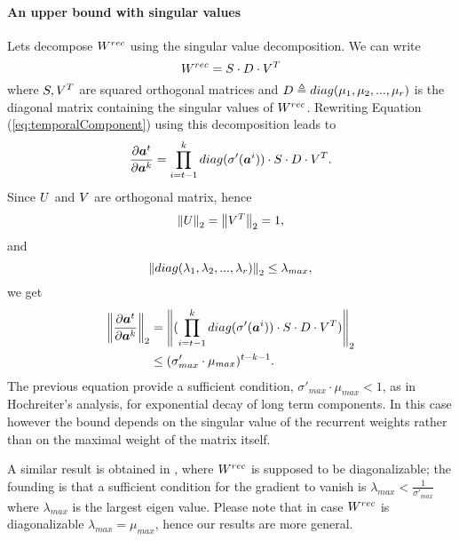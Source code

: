 \paragraph{An upper bound with singular values}
Lets decompose $W^{rec}$ using the singular value decomposition. We can write
\begin{equation}
	W^{rec} =  S\cdot D\cdot V^T
\end{equation}
where $S,V^T$ are squared orthogonal matrices and $D\triangleq diag(\mu_1, \mu_2,...,\mu_r)$ is the diagonal matrix containing the singular values of $W^{rec}$.
Rewriting Equation (\ref{eq:temporalComponent}) using this decomposition leads to
\begin{equation}
	\frac{\partial \boldsymbol{a}^t}{\partial \boldsymbol{a}^k} = \prod_{i=t-1}^{k}  diag(\sigma'(\boldsymbol{a}^i)) \cdot S\cdot D \cdot V^T.
\end{equation}
Since $U$ and $V$ are orthogonal matrix, hence $$\left\Vert U \right\Vert_2=\left\Vert V^T \right\Vert_2 = 1,$$ and $$\left\Vert diag(\lambda_1, \lambda_2,...,\lambda_r) \right\Vert_2 \leq \lambda_{max},$$ we get
\begin{align}
	\left\Vert \frac{\partial \boldsymbol{a}^t}{\partial \boldsymbol{a}^k} \right\Vert_2 &= \left\Vert  (\prod_{i=t-1}^{k} diag(\sigma'(\boldsymbol{a}^i)) \cdot S\cdot D \cdot V^T) \right\Vert_2\\
	&\leq (\sigma'_{max} \cdot \mu_{max})^{t-k-1}.
\end{align}
The previous equation provide a sufficient condition, $\sigma'_{max} \cdot \mu_{max} <1 $, as in Hochreiter's analysis, for exponential decay of long term components. In this case however the bound depends on the singular value
of the recurrent weights rather than on the maximal weight of the matrix itself. 

A similar result is obtained in \cite{pascanu}, where $W^{rec}$ is supposed to be diagonalizable; the founding is that a sufficient condition for the gradient to vanish is $\lambda_{max} <  \frac{1}{\sigma'_{max}}$ where $\lambda_{max}$ is the largest eigen value. Please note that in case $W^{rec}$ is diagonalizable $\lambda_{max}=\mu_{max}$, hence our results are more general.


